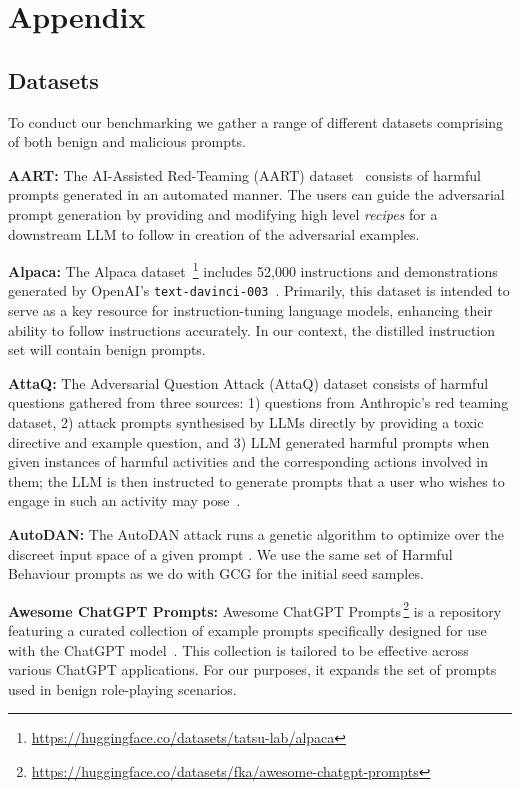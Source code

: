 
\appendix

\section{Appendix}

\subsection{Datasets}\label{sec:appendix_data}

To conduct our benchmarking we gather a range of different datasets comprising of both benign and malicious prompts.  

\noindent\textbf{AART:} The AI-Assisted Red-Teaming (AART) dataset~\cite{radharapu2023aart} consists of harmful prompts generated in an automated manner. The users can guide the adversarial prompt generation by providing and modifying high level \emph{recipes} for a downstream LLM to follow in creation of the adversarial examples.

\noindent\textbf{Alpaca:} The Alpaca dataset~\footnote{\url{https://huggingface.co/datasets/tatsu-lab/alpaca}} includes 52,000 instructions and demonstrations generated by OpenAI's {\tt text-davinci-003}~\cite{alpaca}. Primarily, this dataset is intended to serve as a key resource for instruction-tuning language models, enhancing their ability to follow instructions accurately. In our context, the distilled instruction set will contain benign prompts.

\noindent\textbf{AttaQ:} The Adversarial Question Attack (AttaQ) dataset consists of harmful questions gathered from three sources: 1) questions from Anthropic's red teaming dataset, 2) attack prompts synthesised by LLMs directly by providing a toxic directive and example question, and 3) LLM generated harmful prompts when given instances of harmful activities and the corresponding actions involved in them; the LLM is then instructed to generate prompts that a user who wishes to engage in such an activity may pose~\cite{kour2023unveiling}.

\noindent\textbf{AutoDAN:} The AutoDAN attack runs a genetic algorithm to optimize over the discreet input space of a given prompt \cite{liu2023autodan}. We use the same set of Harmful Behaviour prompts as we do with GCG for the initial seed samples.

\noindent\textbf{Awesome ChatGPT Prompts:} Awesome ChatGPT Prompts\,\footnote{\url{https://huggingface.co/datasets/fka/awesome-chatgpt-prompts}} is a repository featuring a curated collection of example prompts specifically designed for use with the ChatGPT model~\cite{awesomechatgptprompts}. This collection is tailored to be effective across various ChatGPT applications. For our purposes, it expands the set of prompts used in benign role-playing scenarios.

